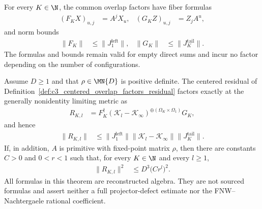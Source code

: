 \begin{lemma}
    \label{thm:c3_centered_overlap_factorization_geometric}
    \leanok
    For every $K\in\N$, the common overlap factors have fiber formulas
    \begin{align}
        (F_KX)_{u,j} & =A^jX_u, &
        (G_KZ)_{u,j} & =Z_jA^u,
    \end{align}
    and norm bounds
    \begin{align}
        \lVert F_K\rVert & \leq\lVert J^{\mathrm{left}}_1\rVert, &
        \lVert G_K\rVert & \leq\lVert J^{\mathrm{tail}}_K\rVert.
    \end{align}
    The formulas and bounds remain valid for empty direct sums and incur no
    factor depending on the number of configurations.

    Assume $D\geq1$ and that $\rho\in\MN{D}$ is positive definite.  The
    centered residual of Definition~\ref{def:c3_centered_overlap_factors_residual}
    factors exactly at the generally nonidentity limiting metric as
    \begin{align}
        R_{K,l}
         & =F_K^\dagger
        (\mathcal K_l-\mathcal K_\infty)^{\oplus
            (\Omega_K\times\Omega_1)}G_K,
    \end{align}
    and hence
    \begin{align}
        \lVert R_{K,l}\rVert
         & \leq \lVert J^{\mathrm{left}}_1\rVert
        \lVert\mathcal K_l-\mathcal K_\infty\rVert
        \lVert J^{\mathrm{tail}}_K\rVert.
    \end{align}
    If, in addition, $A$ is primitive with fixed-point matrix $\rho$, then
    there are constants $C>0$ and $0<r<1$ such that, for every $K\in\N$ and
    every $l\geq1$,
    \begin{align}
        \lVert R_{K,l}\rVert^2
         & \leq D^3\bigl(Cr^l\bigr)^2.
    \end{align}
    All formulas in this theorem are reconstructed algebra.  They are not
    sourced formulas and assert neither a full projector-defect estimate nor
    the FNW--Nachtergaele rational coefficient.
\end{lemma}


